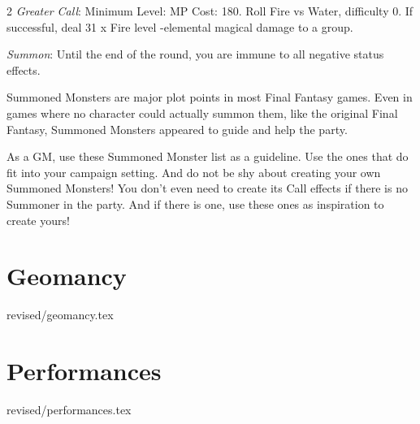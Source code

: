 \begin{multicols}{2}
    \textit{Greater Call}: Minimum Level:  MP Cost: 180. Roll Fire vs Water, difficulty 0. If successful, deal 31 x Fire level -elemental magical damage to a group.
    
    \textit{Summon}: Until the end of the round, you are immune to all negative status effects.

\begin{mog}
    Summoned Monsters are major plot points in most Final Fantasy games. Even in games where no character could actually summon them, like the original Final Fantasy, Summoned Monsters appeared to guide and help the party. \pc%

    As a GM, use these Summoned Monster list as a guideline. Use the ones that do fit into your campaign setting. And do not be shy about creating your own Summoned Monsters! You don't even need to create its Call effects if there is no Summoner in the party. And if there is one, use these ones as inspiration to create yours!
\end{mog}
\end{multicols}
\clearpage
\section{Geomancy}\label{sec:magic-geomancy}
 {revised/geomancy.tex}

\section{Performances}\label{sec:magic-performances}
 {revised/performances.tex}

\clearpage
%
%
%
%
